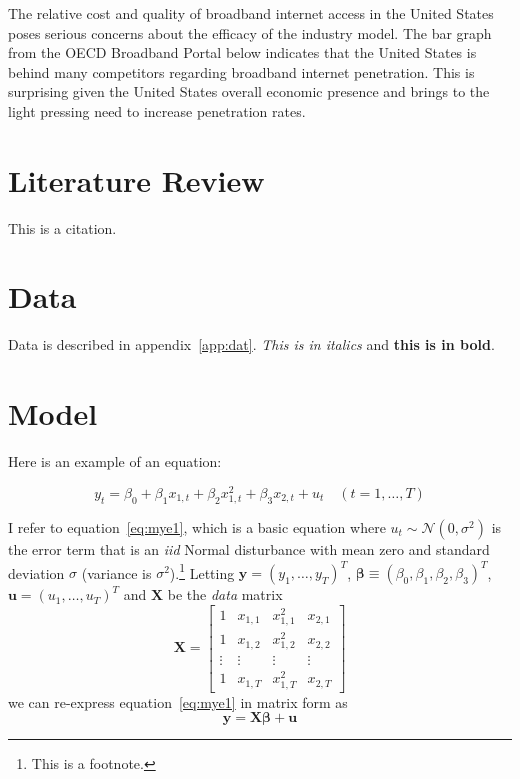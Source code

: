 \documentclass[a4paper,oneside]{article}
\begin{document}
The relative cost and quality of broadband internet access in the United States poses
serious concerns about the efficacy of the industry model. The bar graph from the OECD
Broadband Portal below indicates that the United States is behind many competitors regarding
broadband internet penetration. This is surprising given the United States overall economic
presence and brings to the light pressing need to increase penetration rates.

\section{Literature Review}

\citep{Dixit_1989} This is a citation.

\section{Data}

Data is described in appendix~\ref{app:dat}. \textit{This is in italics} and \textbf{this is in bold}.

\section{Model}

Here is an example of an equation:

\begin{equation}
y_t = \beta_0 + \beta_1x_{1,t} + \beta_2x_{1,t}^2 + \beta_3x_{2,t} + u_t	\quad (t=1,\ldots,T)
\label{eq:mye1}
\end{equation}

I refer to equation~\eqref{eq:mye1}, which is a basic equation where $u_t \sim \mathcal{N}(0,\sigma^2)$ is the error term that is an \textit{iid} Normal disturbance with mean zero and standard deviation $\sigma$ (variance is $\sigma^2$).\footnote{This is a footnote.} Letting $\bm{y}=(y_1,\ldots,y_T)^T$, $\boldsymbol{\beta}\equiv(\beta_0,\beta_1,\beta_2,\beta_3)^T$, $\bm{u}=(u_1,\ldots,u_T)^T$ and $\bm{X}$ be the \textit{data} matrix
\begin{equation*} %
\bm{X} = 
\begin{bmatrix}
1				&	x_{1,1}	&	x_{1,1}^2	& x_{2,1}	\\
1				&	x_{1,2}	&	x_{1,2}^2	& x_{2,2}	\\
\vdots	&	\vdots	&	\vdots		&	\vdots	\\
1				&	x_{1,T}	&	x_{1,T}^2	&	x_{2,T}
\end{bmatrix}
\end{equation*}
we can re-express equation~\eqref{eq:mye1} in matrix form as
\begin{equation*}
\bm{y} = \bm{X}\bm{\beta} + \bm{u}
\end{equation*}
\end{document}
